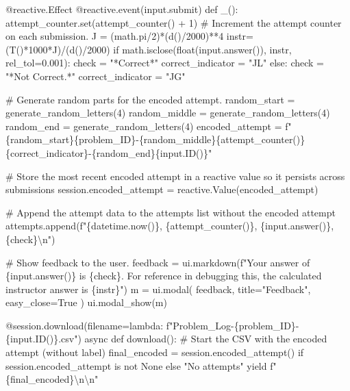 \documentclass[
  letterpaper,
  DIV=11,
  numbers=noendperiod]{scrreprt}
\newenvironment{Shaded}{\begin{snugshade}}{\end{snugshade}}
\newcommand{\NormalTok}[1]{\textcolor[rgb]{0.00,0.23,0.31}{#1}}
\begin{document}
\begin{Shaded}
\begin{Highlighting}[]
\NormalTok{    @reactive.Effect}
\NormalTok{    @reactive.event(input.submit)}
\NormalTok{    def \_():}
\NormalTok{        attempt\_counter.set(attempt\_counter() + 1)  \# Increment the attempt counter on each submission.}
\NormalTok{        J = (math.pi/2)*(d()/2000)**4}
\NormalTok{        instr= (T()*1000*J)/(d()/2000)}
\NormalTok{        if math.isclose(float(input.answer()), instr, rel\_tol=0.001):}
\NormalTok{            check = "*Correct*"}
\NormalTok{            correct\_indicator = "JL"}
\NormalTok{        else:}
\NormalTok{            check = "*Not Correct.*"}
\NormalTok{            correct\_indicator = "JG"}

\NormalTok{        \# Generate random parts for the encoded attempt.}
\NormalTok{        random\_start = generate\_random\_letters(4)}
\NormalTok{        random\_middle = generate\_random\_letters(4)}
\NormalTok{        random\_end = generate\_random\_letters(4)}
\NormalTok{        encoded\_attempt = f"\{random\_start\}\{problem\_ID\}{-}\{random\_middle\}\{attempt\_counter()\}\{correct\_indicator\}{-}\{random\_end\}\{input.ID()\}"}

\NormalTok{        \# Store the most recent encoded attempt in a reactive value so it persists across submissions}
\NormalTok{        session.encoded\_attempt = reactive.Value(encoded\_attempt)}

\NormalTok{        \# Append the attempt data to the attempts list without the encoded attempt}
\NormalTok{        attempts.append(f"\{datetime.now()\}, \{attempt\_counter()\}, \{input.answer()\}, \{check\}\textbackslash{}n")}

\NormalTok{        \# Show feedback to the user.}
\NormalTok{        feedback = ui.markdown(f"Your answer of \{input.answer()\} is \{check\}. For reference in debugging this, the calculated instructor answer is \{instr\}")}
\NormalTok{        m = ui.modal(}
\NormalTok{            feedback,}
\NormalTok{            title="Feedback",}
\NormalTok{            easy\_close=True}
\NormalTok{        )}
\NormalTok{        ui.modal\_show(m)}

\NormalTok{    @session.download(filename=lambda: f"Problem\_Log{-}\{problem\_ID\}{-}\{input.ID()\}.csv")}
\NormalTok{    async def download():}
\NormalTok{        \# Start the CSV with the encoded attempt (without label)}
\NormalTok{        final\_encoded = session.encoded\_attempt() if session.encoded\_attempt is not None else "No attempts"}
\NormalTok{        yield f"\{final\_encoded\}\textbackslash{}n\textbackslash{}n"}
        

\end{Highlighting}
\end{Shaded}
\end{document}
